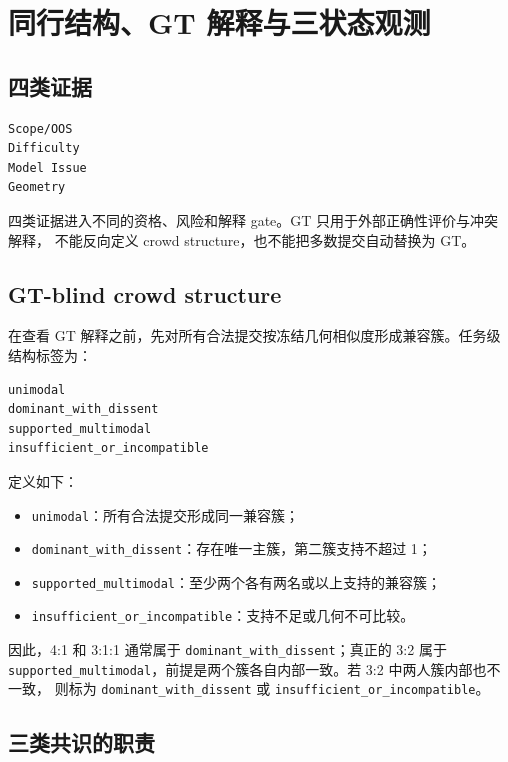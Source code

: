 \section{同行结构、GT 解释与三状态观测}

\subsection{四类证据}

\begin{verbatim}
Scope/OOS
Difficulty
Model Issue
Geometry
\end{verbatim}

四类证据进入不同的资格、风险和解释 gate。GT 只用于外部正确性评价与冲突解释，
不能反向定义 crowd structure，也不能把多数提交自动替换为 GT。

\subsection{GT-blind crowd structure}

在查看 GT 解释之前，先对所有合法提交按冻结几何相似度形成兼容簇。任务级结构标签为：

\begin{verbatim}
unimodal
dominant_with_dissent
supported_multimodal
insufficient_or_incompatible
\end{verbatim}

定义如下：
\begin{itemize}
  \item \texttt{unimodal}：所有合法提交形成同一兼容簇；
  \item \texttt{dominant\_with\_dissent}：存在唯一主簇，第二簇支持不超过 1；
  \item \texttt{supported\_multimodal}：至少两个各有两名或以上支持的兼容簇；
  \item \texttt{insufficient\_or\_incompatible}：支持不足或几何不可比较。
\end{itemize}

因此，4:1 和 3:1:1 通常属于 \texttt{dominant\_with\_dissent}；真正的 3:2 属于
\texttt{supported\_multimodal}，前提是两个簇各自内部一致。若 3:2 中两人簇内部也不一致，
则标为 \texttt{dominant\_with\_dissent} 或 \texttt{insufficient\_or\_incompatible}。

\subsection{三类共识的职责}

